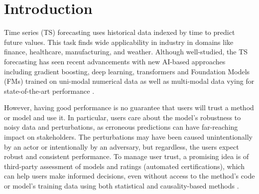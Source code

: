 \section{Introduction}
\label{sec:introduction}

Time series (TS) forecasting  uses historical data indexed by time to predict future values. 
This task finds wide applicability in industry in domains like finance, healthcare, manufacturing, and weather. Although well-studied, the TS forecasting has seen recent  advancements with new  AI-based approaches including gradient boosting, deep learning, transformers and Foundation Models (FMs) trained on uni-modal numerical data as well as multi-modal data vying for  state-of-the-art performance \cite{classical-vs-dl-llm-ts,jin2023time}. 

However, having good performance is no guarantee that users will trust a method or model and use it. In particular, users care about the model's robustness to noisy data and perturbations, as erroneous predictions can have far-reaching impact on stakeholders. 
The perturbations may have been caused unintentionally by an actor or intentionally by an adversary, but regardless, the users expect robust and consistent performance.
To manage user trust, a promising idea is of third-party assessment of models and ratings (automated certifications), which can help users make informed decisions, even without access to the method's code or model's training data using both statistical \cite{srivastava2018towards,srivastava2020rating,srivastava2023advances-rating} and causality-based methods \cite{kausik2023the,kausik2024rating}.

